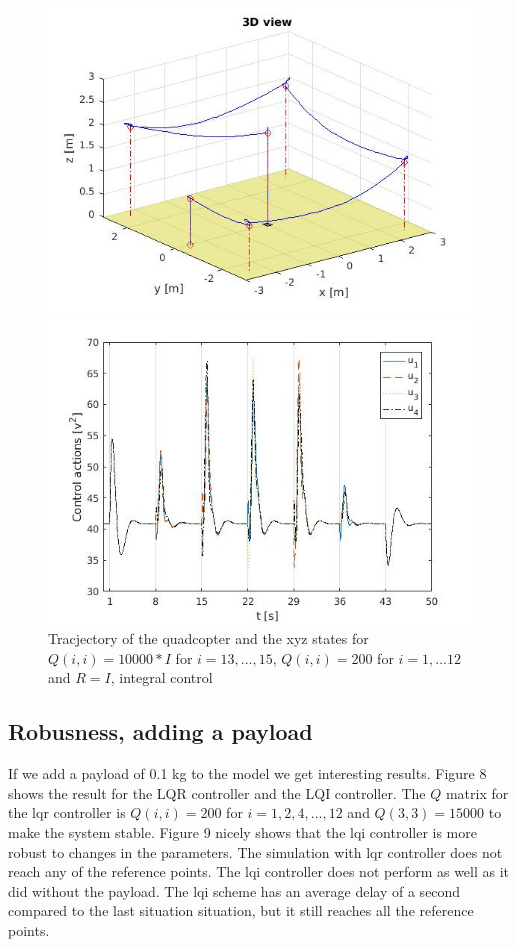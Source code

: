 \documentclass[]{article}
\begin{document}
\begin{figure}[H]
\begin{minipage}{.5\textwidth}
\includegraphics[width=\textwidth]{trajectoryi3.jpg}
\end{minipage}%
\begin{minipage}{.5\textwidth}
\includegraphics[width=\textwidth]{xyzi3.jpg}
\end{minipage}
\caption{Tracjectory of the quadcopter and the xyz states for $Q(i,i) = 10000*I$ for $i = 13,...,15$, $Q(i,i) = 200$ for $i = 1,...12$ and $R = I$, integral control}
\end{figure}

\subsection{Robusness, adding a payload}
If we add a payload of 0.1 kg to the model we get interesting results. Figure 8 shows the result for the LQR controller and the LQI controller. The $Q$ matrix for the lqr controller is $Q(i,i) = 200$ for $i = 1,2,4,...,12$ and $Q(3,3)=15000$ to make the system stable. Figure 9 nicely shows that the lqi controller is more robust to changes in the parameters. The simulation with lqr controller does not reach any of the reference points. The lqi controller does not perform as well as it did without the payload. The lqi scheme has an average delay of a second compared to the last situation situation, but it still reaches all the reference points.
\end{document}
